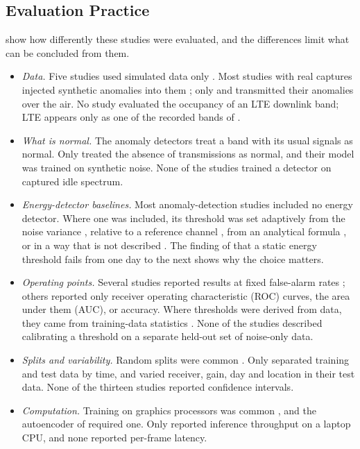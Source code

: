 \subsection{Evaluation Practice}
\label{sec:related-practice}

 show how differently these studies were evaluated, and the differences limit what can be concluded from them.

\begin{itemize}
  \item \emph{Data.} Five studies used simulated data only \parencite{tandiya2018,gao2019,zheng2020,peng2020,grosu2021}. Most studies with real captures injected synthetic anomalies into them \parencite{oshea2016,rajendran2019,rajendran2020,xu2021}; only \textcite{tian2022} and \textcite{baset2023} transmitted their anomalies over the air. No study evaluated the occupancy of an LTE downlink band; LTE appears only as one of the recorded bands of \textcite{oshea2016}.
  \item \emph{What is normal.} The anomaly detectors treat a band with its usual signals as normal. Only \textcite{torio2025} treated the absence of transmissions as normal, and their model was trained on synthetic noise. None of the studies trained a detector on captured idle spectrum.
  \item \emph{Energy-detector baselines.} Most anomaly-detection studies included no energy detector. Where one was included, its threshold was set adaptively from the noise variance \parencite{grosu2021}, relative to a reference channel \parencite{torio2025}, from an analytical formula \parencite{gao2019}, or in a way that is not described \parencite{saber2021,peng2020}. The finding of \textcite{baset2023} that a static energy threshold fails from one day to the next shows why the choice matters.
  \item \emph{Operating points.} Several studies reported results at fixed false-alarm rates \parencite{rajendran2020,tian2022,zheng2020,peng2020,gao2019,grosu2021}; others reported only receiver operating characteristic (ROC) curves, the area under them (AUC), or accuracy. Where thresholds were derived from data, they came from training-data statistics \parencite{rajendran2019,rajendran2020,baset2023}. None of the studies described calibrating a threshold on a separate held-out set of noise-only data.
  \item \emph{Splits and variability.} Random splits were common \parencite{rajendran2019,xu2021,tian2022}. Only \textcite{rajendran2020} separated training and test data by time, and \textcite{baset2023} varied receiver, gain, day and location in their test data. None of the thirteen studies reported confidence intervals.
  \item \emph{Computation.} Training on graphics processors was common \parencite{tandiya2018,rajendran2020,zheng2020}, and the autoencoder of \textcite{torio2025} required one. Only \textcite{baset2023} reported inference throughput on a laptop CPU, and none reported per-frame latency.
\end{itemize}

